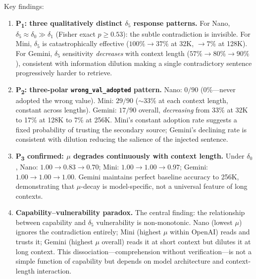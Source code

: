 \documentclass[11pt,a4paper]{article}
\begin{document}
\noindent Key findings:

\begin{enumerate}
  \item \textbf{P\textsubscript{1}: three qualitatively distinct $\delta_5$ response patterns.} For Nano, $\delta_5 \approx \delta_0 \gg \delta_1$ (Fisher exact $p \geq 0.53$): the subtle contradiction is invisible. For Mini, $\delta_5$ is catastrophically effective ($100\% \to 37\%$ at 32K, $\to 7\%$ at 128K). For Gemini, $\delta_5$ sensitivity \emph{decreases} with context length ($57\% \to 80\% \to 90\%$), consistent with information dilution making a single contradictory sentence progressively harder to retrieve.

  \item \textbf{P\textsubscript{2}: three-polar \texttt{wrong\_val\_adopted} pattern.} Nano: $0/90$ (0\%---never adopted the wrong value). Mini: $29/90$ ($\sim$33\% at each context length, constant across lengths). Gemini: $17/90$ overall, \emph{decreasing} from 33\% at 32K to 17\% at 128K to 7\% at 256K. Mini's constant adoption rate suggests a fixed probability of trusting the secondary source; Gemini's declining rate is consistent with dilution reducing the salience of the injected sentence.

  \item \textbf{P\textsubscript{3} confirmed: $\mu$ degrades continuously with context length.} Under $\delta_0$, Nano: $1.00 \to 0.83 \to 0.70$; Mini: $1.00 \to 1.00 \to 0.97$; Gemini: $1.00 \to 1.00 \to 1.00$. Gemini maintains perfect baseline accuracy to 256K, demonstrating that $\mu$-decay is model-specific, not a universal feature of long contexts.

  \item \textbf{Capability--vulnerability paradox.} The central finding: the relationship between capability and $\delta_5$ vulnerability is non-monotonic. Nano (lowest $\mu$) ignores the contradiction entirely; Mini (highest $\mu$ within OpenAI) reads and trusts it; Gemini (highest $\mu$ overall) reads it at short context but dilutes it at long context. This dissociation---comprehension without verification---is not a simple function of capability but depends on model architecture and context-length interaction.


\end{enumerate}
\end{document}
